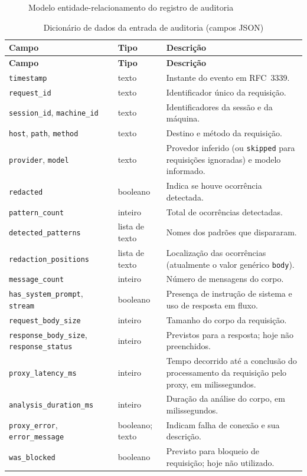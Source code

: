 \begin{figure}[htb]
\centering
\caption{Modelo entidade-relacionamento do registro de auditoria}\label{fig:er_aud}
\end{figure}

{\small
\begin{longtable}{|p{4.2cm}|p{1.9cm}|p{7.6cm}|}
\caption{Dicionário de dados da entrada de auditoria (campos JSON)}\label{tab:dd_aud}\\
\hline
\textbf{Campo} & \textbf{Tipo} & \textbf{Descrição} \\ \hline
\endfirsthead
\hline
\textbf{Campo} & \textbf{Tipo} & \textbf{Descrição} \\ \hline
\endhead
\texttt{timestamp} & texto & Instante do evento em RFC~3339. \\ \hline
\texttt{request\_id} & texto & Identificador único da requisição. \\ \hline
\texttt{session\_id}, \texttt{machine\_id} & texto & Identificadores da sessão e da máquina. \\ \hline
\texttt{host}, \texttt{path}, \texttt{method} & texto & Destino e método da requisição. \\ \hline
\texttt{provider}, \texttt{model} & texto & Provedor inferido (ou \texttt{skipped} para requisições ignoradas) e modelo informado. \\ \hline
\texttt{redacted} & booleano & Indica se houve ocorrência detectada. \\ \hline
\texttt{pattern\_count} & inteiro & Total de ocorrências detectadas. \\ \hline
\texttt{detected\_patterns} & lista de texto & Nomes dos padrões que dispararam. \\ \hline
\texttt{redaction\_positions} & lista de texto & Localização das ocorrências (atualmente o valor genérico \texttt{body}). \\ \hline
\texttt{message\_count} & inteiro & Número de mensagens do corpo. \\ \hline
\texttt{has\_system\_prompt}, \texttt{stream} & booleano & Presença de instrução de sistema e uso de resposta em fluxo. \\ \hline
\texttt{request\_body\_size} & inteiro & Tamanho do corpo da requisição. \\ \hline
\texttt{response\_body\_size}, \texttt{response\_status} & inteiro & Previstos para a resposta; hoje não preenchidos. \\ \hline
\texttt{proxy\_latency\_ms} & inteiro & Tempo decorrido até a conclusão do processamento da requisição pelo proxy, em milissegundos. \\ \hline
\texttt{analysis\_duration\_ms} & inteiro & Duração da análise do corpo, em milissegundos. \\ \hline
\texttt{proxy\_error}, \texttt{error\_message} & booleano; texto & Indicam falha de conexão e sua descrição. \\ \hline
\texttt{was\_blocked} & booleano & Previsto para bloqueio de requisição; hoje não utilizado. \\ \hline
\end{longtable}
}
